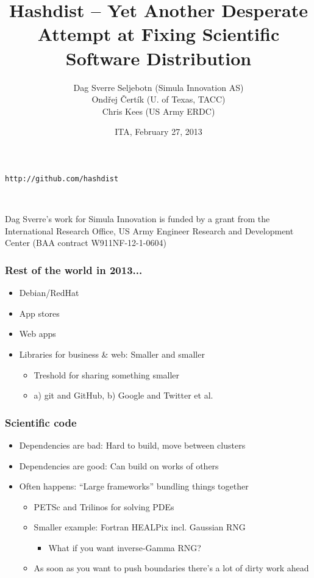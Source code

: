 \documentclass[sans,mathserif]{beamer}
\title{Hashdist -- Yet Another Desperate Attempt at Fixing Scientific Software Distribution}
\author{Dag Sverre Seljebotn (Simula Innovation AS)\\Ond\v{r}ej \v{C}ert\'{i}k (U. of Texas, TACC)\\Chris Kees (US Army ERDC)}
\date{ITA, February 27, 2013}
\begin{document}
\begin{frame}
  \titlepage

  \begin{center} {\tt http://github.com/hashdist}
  \end{center}
~

{\footnotesize

Dag Sverre's work for Simula Innovation is funded by a grant from the \\
International Research Office, US Army Engineer Research and Development Center
(BAA contract W911NF-12-1-0604)
}

\end{frame}


\begin{frame}
  \frametitle{Rest of the world in 2013...}

  \begin{itemize}
    \item<+-> Debian/RedHat
    \item<+-> App stores
    \item<+-> Web apps
    \item<+-> Libraries for business \& web: Smaller and smaller
      \begin{itemize}
        \item<+-> Treshold for sharing something smaller
        \item<+-> a) git and GitHub, b) Google and Twitter et al.
      \end{itemize}
  \end{itemize}
\end{frame}

\begin{frame}
  \frametitle{Scientific code}
  \begin{itemize}
  \item<+-> Dependencies are bad: Hard to build, move between clusters
  \item<+-> Dependencies are good: Can build on works of others
  \item<+-> Often happens: ``Large frameworks'' bundling things together
    \begin{itemize}
    \item<+-> PETSc and Trilinos for solving PDEs
    \item<+-> Smaller example: Fortran HEALPix incl. Gaussian RNG
      \begin{itemize}
      \item What if you want inverse-Gamma RNG?
      \end{itemize}
    \item<+-> As soon as you want to push boundaries there's a lot of dirty work ahead
    \end{itemize}
  \end{itemize}
\end{frame}
\end{document}

